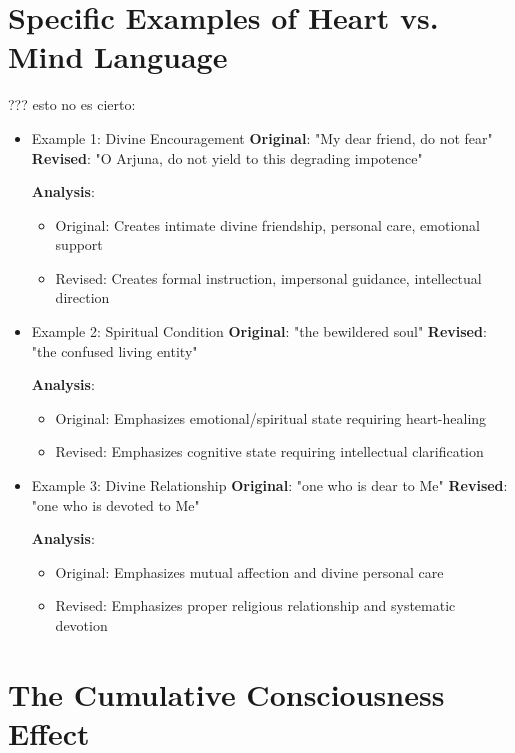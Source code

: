 \documentclass[11pt,twoside]{book}
\begin{document}
\section*{Specific Examples of Heart vs. Mind Language}
\label{sec:org797cdda}
??? esto no es cierto:
\begin{itemize}
\item Example 1: Divine Encouragement
\label{sec:org1b85da5}
\textbf{\textbf{Original}}: "My dear friend, do not fear"
\textbf{\textbf{Revised}}: "O Arjuna, do not yield to this degrading impotence"

\textbf{\textbf{Analysis}}: 
\begin{itemize}
\item Original: Creates intimate divine friendship, personal care, emotional support
\item Revised: Creates formal instruction, impersonal guidance, intellectual direction
\end{itemize}
\item Example 2: Spiritual Condition
\label{sec:orgbbf7cca}
\textbf{\textbf{Original}}: "the bewildered soul"  
\textbf{\textbf{Revised}}: "the confused living entity"

\textbf{\textbf{Analysis}}:
\begin{itemize}
\item Original: Emphasizes emotional/spiritual state requiring heart-healing
\item Revised: Emphasizes cognitive state requiring intellectual clarification
\end{itemize}
\item Example 3: Divine Relationship
\label{sec:org24cfb2f}
\textbf{\textbf{Original}}: "one who is dear to Me"
\textbf{\textbf{Revised}}: "one who is devoted to Me"

\textbf{\textbf{Analysis}}:
\begin{itemize}
\item Original: Emphasizes mutual affection and divine personal care
\item Revised: Emphasizes proper religious relationship and systematic devotion
\end{itemize}
\end{itemize}
\section*{The Cumulative Consciousness Effect}
\label{sec:org02cd1bb}
\end{document}
